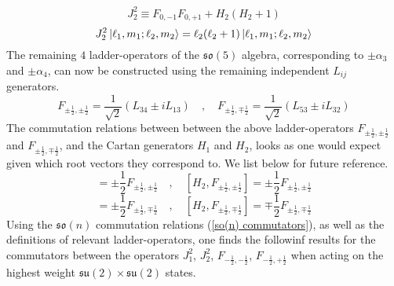 %
%
\begin{equation}
J_2^2 \equiv F_{0,-1} F_{0,+1} + H_2 (H_2 + 1)
\end{equation}
%
%
\begin{equation}
J_2^2 \ket{\ell_1, m_1;\ell_2, m_2} = \ell_2 (\ell_2 + 1) \ket{\ell_1, m_1;\ell_2, m_2}
\end{equation}
%
%
The remaining $4$ ladder-operators of the $\mathfrak{so}(5)$ algebra, corresponding to $\pm \alpha_3$ and $\pm \alpha_4$, can now be constructed using the remaining independent $L_{ij}$ generators.
%
%
\begin{equation}\label{so(5) ladder-operators}
F_{\pm \frac{1}{2},\pm \frac{1}{2}} = \frac{1}{\sqrt{2}} (L_{34} \pm i L_{13})
%
\quad , \quad
%
F_{\pm \frac{1}{2},\mp \frac{1}{2}} = \frac{1}{\sqrt{2}} (L_{53} \pm i L_{32})
\end{equation}
%
%
The commutation relations between between the above ladder-operators $F_{\pm \frac{1}{2},\pm \frac{1}{2}}$ and $F_{\pm \frac{1}{2},\mp \frac{1}{2}}$, and the Cartan generators $H_1$ and $H_2$, looks as one would expect given which root vectors they correspond to. We list below for future reference.
%
%
\begin{equation}
[H_1, F_{\pm \frac{1}{2},\pm \frac{1}{2}}] = \pm \frac{1}{2} F_{\pm \frac{1}{2},\pm \frac{1}{2}}
%
\quad , \quad
%
[H_2, F_{\pm \frac{1}{2},\pm \frac{1}{2}}] = \pm \frac{1}{2} F_{\pm \frac{1}{2},\pm \frac{1}{2}}
\end{equation}
%
%
\begin{equation}
[H_1, F_{\pm \frac{1}{2},\mp \frac{1}{2}}] = \pm \frac{1}{2} F_{\pm \frac{1}{2},\mp \frac{1}{2}}
%
\quad , \quad
%
[H_2, F_{\pm \frac{1}{2},\mp \frac{1}{2}}] = \mp \frac{1}{2} F_{\pm \frac{1}{2},\mp \frac{1}{2}}
\end{equation}
%
%
%
Using the $\mathfrak{so}(n)$ commutation relations (\ref{so(n) commutators}), as well as the definitions of relevant ladder-operators, one finds the followinf results for the commutators between the operators $J_1^2$, $J_2^2$, $F_{-\frac{1}{2},-\frac{1}{2}}$, $F_{-\frac{1}{2},+\frac{1}{2}}$ when acting on the highest weight $\mathfrak{su}(2) \times \mathfrak{su}(2)$ states.
